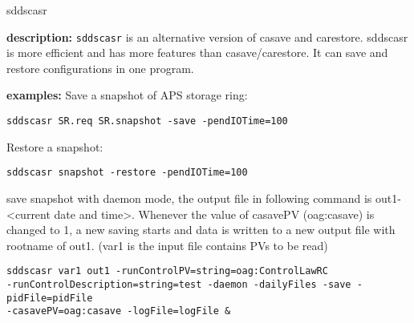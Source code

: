 \begin{sddsprog}{sddscasr}
\item \textbf{description:}
\verb+sddscasr+ is an alternative version of casave and carestore. sddscasr is
more efficient and has more features than casave/carestore. It can save
and restore configurations in one program.

\item \textbf{examples:}
Save a snapshot of APS storage ring:
\begin{verbatim}
sddscasr SR.req SR.snapshot -save -pendIOTime=100
\end{verbatim}
Restore a snapshot:
\begin{verbatim}
sddscasr snapshot -restore -pendIOTime=100
\end{verbatim}
save snapshot with daemon mode, the output file in following command is out1-<current date and time>.
Whenever the value of casavePV (oag:casave) is changed to 1, a new saving starts and data is written
to a new output file with rootname of out1. (var1 is the input file contains PVs to be read)
\begin{verbatim}
sddscasr var1 out1 -runControlPV=string=oag:ControlLawRC
-runControlDescription=string=test -daemon -dailyFiles -save -pidFile=pidFile
-casavePV=oag:casave -logFile=logFile &
\end{verbatim}


\end{sddsprog}
